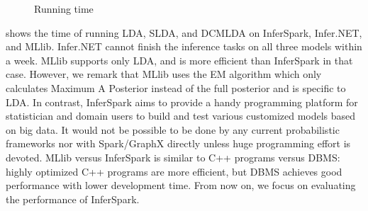 \begin{figure}[h]
\centering
	\caption{Running time}
    \label{fig:exp_comparison}
\end{figure} 



 shows the time of running LDA, SLDA, and DCMLDA 
on InferSpark, Infer.NET, and MLlib.
Infer.NET cannot finish the inference tasks on all three models within a week.
MLlib supports only LDA, and is more efficient than InferSpark in that case.
However, we remark that MLlib uses the EM algorithm which only
calculates Maximum A Posterior instead of the full posterior and is specific to LDA.
In contrast, InferSpark aims to provide a handy programming platform for statistician and domain users to build and test various customized models based on big data.
It would not be possible to be done by any current probabilistic frameworks nor with Spark/GraphX directly unless huge programming effort is devoted.  
MLlib versus InferSpark 
is similar to C++ programs versus DBMS: highly optimized C++ programs are more efficient, 
but DBMS achieves good performance with lower development time.
From now on, we focus on evaluating the performance of InferSpark.




